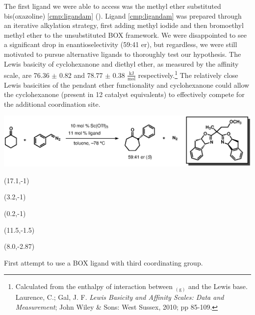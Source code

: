 The first ligand we were able to access was the methyl ether substituted bis(oxazoline)
\ref{cmp:ligandam} ().
Ligand \ref{cmp:ligandam} was prepared through an iterative alkylation strategy, first adding methyl
iodide and then bromoethyl methyl ether to the unsubstituted BOX framework. We were disappointed to
see a significant drop in enantioselectivity (59:41 er), but regardless, we were still motivated to
pursue alternative ligands to thoroughly test our hypothesis. The Lewis basicity of cyclohexanone and diethyl ether, as
measured by the  affinity scale, are 76.36 $\pm$ 0.82 and 78.77 $\pm$ 0.38
$\frac{\mathrm{kJ}}{\mathrm{mol}}$ respectively.\footnote{Calculated from the enthalpy of
interaction between $_{\mathrm{(g)}}$ and the Lewis base. Laurence, C.; Gal, J. F.
\textit{Lewis Basicity and Affinity Scales: Data and Measurement}; John Wiley \& Sons: West Sussex,
2010; pp 85-109.} The relatively close Lewis basicities of the pendant ether functionality and
cyclohexanone could allow the cyclohexanone (present in 12 catalyst equivalents) to effectively compete for the additional coordination site.
 \begin{Scheme}[h]
  \centering
  \includegraphics[scale=0.8]{chp_asymmetric/images/methyletherligand}
 \begin{textblock}{1}(17.1,-1)  \end{textblock}
 \begin{textblock}{1}(3.2,-1)  \end{textblock}
  \begin{textblock}{1}(0.2,-1)  \end{textblock}
  \begin{textblock}{1}(11.5,-1.5)  \end{textblock}
  \begin{textblock}{1}(8.0,-2.87)  \end{textblock}
  \caption{First attempt to use a BOX ligand with third coordinating group.}
  \label{sch:asmethyletherligand}
\end{Scheme}


